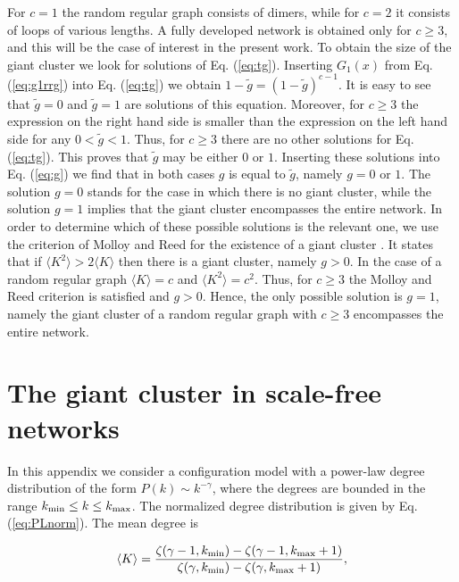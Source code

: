 \documentclass[preprint,pre,superscriptaddress,showpacs]{revtex4}
\begin{document}
\noindent
For $c=1$ the random regular graph 
consists of dimers, while for $c=2$
it consists of loops of various lengths.
A fully developed network is obtained only for $c \ge 3$,
and this will be the case of interest in the present work.
To obtain the size of the giant cluster we look for solutions 
of Eq. (\ref{eq:tg}). 
Inserting $G_1(x)$ from Eq. (\ref{eq:g1rrg}) 
into Eq. (\ref{eq:tg}) we obtain 
$1 - \tilde g = (1-\tilde g)^{c-1}$.
It is easy to see that $\tilde g=0$
and $\tilde g = 1$ are solutions of this equation.
Moreover, for $c \ge 3$ the expression on the right hand side is
smaller than the expression on the left hand side for any
$0 < \tilde g < 1$.
Thus, for $c \ge 3$ there are
no other solutions for Eq. (\ref{eq:tg}).
This proves that $\tilde g$ may be either $0$ or $1$.
Inserting these solutions into Eq. (\ref{eq:g}) we find that
in both cases
$g$ is equal to $\tilde g$, namely
$g=0$ or $1$.
The solution $g=0$ stands for the case in which there is no giant 
cluster, while the solution $g=1$ implies that the giant cluster
encompasses the entire network.
In order to determine which of these possible solutions is the relevant one,
we use the criterion of Molloy and Reed for the existence of a giant 
cluster
\cite{Molloy1995,Molloy1998}. 
It states that if
$\langle K^2 \rangle > 2 \langle K \rangle$
then there is a giant cluster, namely $g > 0$.
In the case of a random regular graph 
$\langle K \rangle = c$
and 
$\langle K^2 \rangle = c^2$.
Thus, for $c \ge 3$ the 
Molloy and Reed
criterion is satisfied and $g > 0$.
Hence, the only possible solution is $g=1$, namely
the giant cluster of a random regular graph with $c \ge 3$ 
encompasses the entire network.

\section{The giant cluster in scale-free networks}

In this appendix we consider a configuration model 
with a power-law degree
distribution of the form
$P(k) \sim k^{-\gamma}$,
where the degrees are bounded in the range
$k_{\rm min} \le k \le k_{\rm max}$.
The normalized degree distribution is given by
Eq. (\ref{eq:PLnorm}).
The mean degree is

\begin{equation}
\langle K \rangle = 
\frac{ \zeta(\gamma-1,k_{\rm min}) - \zeta(\gamma-1,k_{\rm max}+1) }
{ \zeta(\gamma,k_{\rm min}) - \zeta(\gamma,k_{\rm max}+1) },
\label{eq:Kmsf}
\end{equation}
\end{document}
